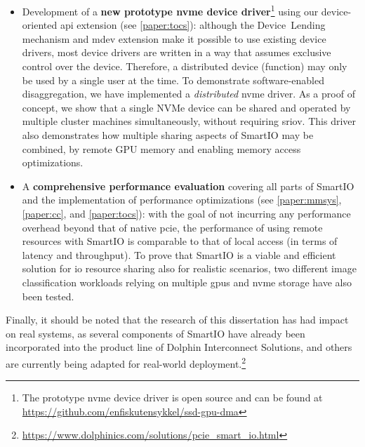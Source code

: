 \begin{itemize}
    \item Development of a \textbf{new prototype \gls{nvme} device driver}\footnote{The prototype \gls{nvme} device driver is open source and can be found at \mbox{\url{https://github.com/enfiskutensykkel/ssd-gpu-dma}}} using our device-oriented \gls{api} extension (see \cref{paper:tocs}):
    although the Device~Lending mechanism and \gls{mdev} extension make it possible to use existing device drivers, most device drivers are written in a way that assumes exclusive control over the device. Therefore, a distributed device (function) may only be used by a single user at the time.
    To demonstrate software-enabled \gls{disaggregation}, we have implemented a \emph{distributed} \gls{nvme} driver. 
    As a proof of concept, we show that a single NVMe device can be shared and operated by multiple cluster machines simultaneously, without requiring \gls{sriov}.
	This driver also demonstrates how multiple sharing aspects of SmartIO may be combined, 
	by  remote GPU memory and enabling memory access optimizations.

    \item A \textbf{comprehensive performance evaluation} covering all parts of SmartIO and the implementation of performance optimizations (see \cref{paper:mmsys}, \cref{paper:cc}, and \cref{paper:tocs}):
        with the goal of not incurring any performance overhead beyond that of native \gls{pcie}, the performance of using remote resources with SmartIO is comparable to that of local access (in terms of latency and throughput).
        To prove that SmartIO is a viable and efficient solution for \gls{io} resource sharing also for realistic scenarios, two different image classification workloads relying on multiple \glspl{gpu} and \gls{nvme} storage have also been tested.
	
\end{itemize}
%
Finally, it should be noted that the research of this dissertation has had impact on real systems, as several components of SmartIO have already been incorporated into the product line of Dolphin Interconnect Solutions, and others are currently being adapted for real-world deployment.\footnote{{\url{https://www.dolphinics.com/solutions/pcie_smart_io.html}}}


